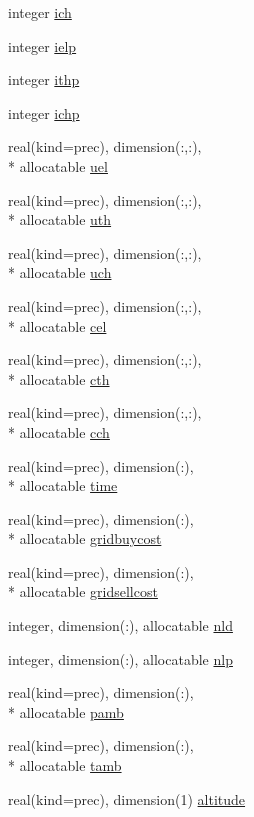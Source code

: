 \begin{DoxyCompactItemize}
\item 
integer \hyperlink{classinputvar_a69cdcc78492d1a96e3f02ee2915f207d}{ich}
\item 
integer \hyperlink{classinputvar_a0190bc42c3dad91d811c585952ff55f4}{ielp}
\item 
integer \hyperlink{classinputvar_abb9734f3e3ee40c97881bd03881065c5}{ithp}
\item 
integer \hyperlink{classinputvar_af57151a30c510558682b98e1b72d844b}{ichp}
\item 
real(kind=prec), dimension(\-:,\-:), \\*
allocatable \hyperlink{classinputvar_a8540cf286b75c5a77a2c3f8e2623617a}{uel}
\item 
real(kind=prec), dimension(\-:,\-:), \\*
allocatable \hyperlink{classinputvar_abd9a09032c8d997c45cd49020fb78609}{uth}
\item 
real(kind=prec), dimension(\-:,\-:), \\*
allocatable \hyperlink{classinputvar_a53339aa6533c8e2333ec3eaa4a54796b}{uch}
\item 
real(kind=prec), dimension(\-:,\-:), \\*
allocatable \hyperlink{classinputvar_aae07469e8800dce385d02a73306d320c}{cel}
\item 
real(kind=prec), dimension(\-:,\-:), \\*
allocatable \hyperlink{classinputvar_adcb3f28e49daee36d91bc87941f486c9}{cth}
\item 
real(kind=prec), dimension(\-:,\-:), \\*
allocatable \hyperlink{classinputvar_a88bb670dc0bca944104c292071818a36}{cch}
\item 
real(kind=prec), dimension(\-:), \\*
allocatable \hyperlink{classinputvar_a7d20a57b0a7dfe6c386e831f25636546}{time}
\item 
real(kind=prec), dimension(\-:), \\*
allocatable \hyperlink{classinputvar_a10f5c69ad85799dd2ae3a39500ba3005}{gridbuycost}
\item 
real(kind=prec), dimension(\-:), \\*
allocatable \hyperlink{classinputvar_a2f72c3ce64312b528c0679cbd950fb8f}{gridsellcost}
\item 
integer, dimension(\-:), allocatable \hyperlink{classinputvar_a8c5a23a5a519fb86c67fc1465aef0e33}{nld}
\item 
integer, dimension(\-:), allocatable \hyperlink{classinputvar_a3f2f71983b35bd63596385392671f89d}{nlp}
\item 
real(kind=prec), dimension(\-:), \\*
allocatable \hyperlink{classinputvar_a241f8b7a07fdc252022c2ef56cfded42}{pamb}
\item 
real(kind=prec), dimension(\-:), \\*
allocatable \hyperlink{classinputvar_a1cdc501a6b8cb511ab141219362b9aaa}{tamb}
\item 
real(kind=prec), dimension(1) \hyperlink{classinputvar_a3f078edd3f3cfd59802ac6321ad3b837}{altitude}
\end{DoxyCompactItemize}


